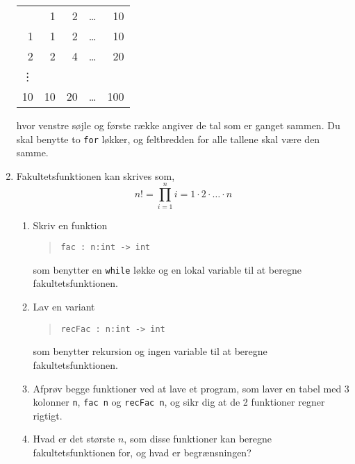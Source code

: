 \documentclass[a4paper,12pt]{article}
\begin{document}
\begin{enumerate}[label=3ø.\arabic*,start=0]
  \begin{center}
    \begin{tabular}{rrrrr}
      &1 & 2 & \dots & 10\\
      1 &1 & 2 & \dots & 10\\
      2 &2 & 4 & \dots & 20\\
      \vdots \\
      10 &10 & 20 & \dots & 100\\
    \end{tabular}
  \end{center}
hvor venstre søjle og første række angiver de tal som er ganget sammen. Du skal benytte to \lstinline!for! løkker, og feltbredden for alle tallene skal være den samme. 
\item Fakultetsfunktionen kan skrives som,
  \begin{equation}
    n! = \prod_{i=1}^n i = 1\cdot 2\cdot \ldots \cdot n
  \end{equation}
  \begin{enumerate}
  \item Skriv en funktion
    \begin{quote}
      \mbox{\lstinline!fac : n:int -> int!}
    \end{quote}
som benytter en \lstinline!while! løkke og en lokal variable til at beregne fakultetsfunktionen.
  \item Lav en variant
    \begin{quote}
      \mbox{\lstinline!recFac : n:int -> int!}
    \end{quote}
som benytter rekursion og ingen variable til at beregne fakultetsfunktionen.
  \item Afprøv begge funktioner ved at lave et program, som laver en tabel med 3 kolonner \lstinline!n!, \mbox{\lstinline!fac n!} og \mbox{\lstinline!recFac n!}, og sikr dig at de 2 funktioner regner rigtigt.
  \item Hvad er det største $n$, som disse funktioner kan beregne fakultetsfunktionen for, og hvad er begrænsningen?
  \end{enumerate}
\end{enumerate}
\end{document}

